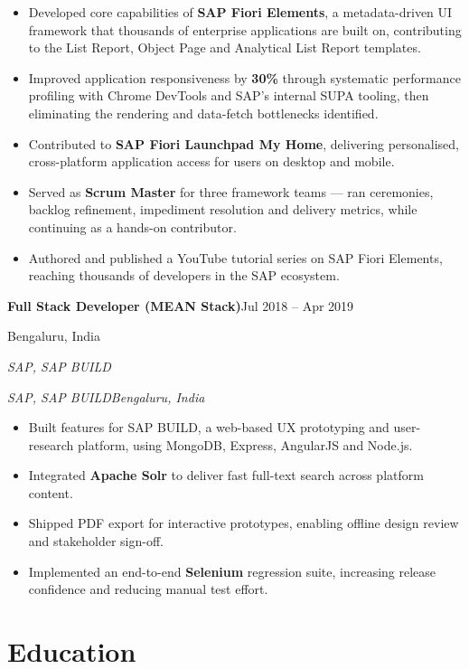 \documentclass[11pt,a4paper]{article}
\makeatletter
\newcommand{\role}[2]{{\parfillskip=0pt\relax\noindent\textbf{#1}\hfill #2\par}}
\newcommand{\org}[2]{%
  \def\@tmp{#2}%
  \ifx\@tmp\@empty
    {\noindent\textit{#1}\par}%
  \else
    {\parfillskip=0pt\relax\noindent\textit{#1}\hfill\textit{#2}\par}%
  \fi
  \vspace{2pt}}
\makeatother
\begin{document}
\begin{itemize}
  \item Developed core capabilities of \textbf{SAP Fiori Elements}, a metadata-driven UI framework
        that thousands of enterprise applications are built on, contributing to the List Report,
        Object Page and Analytical List Report templates.
  \item Improved application responsiveness by \textbf{30\%} through systematic performance
        profiling with Chrome DevTools and SAP's internal SUPA tooling, then eliminating the
        rendering and data-fetch bottlenecks identified.
  \item Contributed to \textbf{SAP Fiori Launchpad My Home}, delivering personalised, cross-platform
        application access for users on desktop and mobile.
  \item Served as \textbf{Scrum Master} for three framework teams --- ran ceremonies, backlog
        refinement, impediment resolution and delivery metrics, while continuing as a hands-on
        contributor.
  \item Authored and published a YouTube tutorial series on SAP Fiori Elements, reaching thousands
        of developers in the SAP ecosystem.
\end{itemize}

\role{Full Stack Developer (MEAN Stack)}{Jul 2018 -- Apr 2019}
\org{SAP, SAP BUILD}{Bengaluru, India}

\begin{itemize}
  \item Built features for SAP BUILD, a web-based UX prototyping and user-research platform, using
        MongoDB, Express, AngularJS and Node.js.
  \item Integrated \textbf{Apache Solr} to deliver fast full-text search across platform content.
  \item Shipped PDF export for interactive prototypes, enabling offline design review and
        stakeholder sign-off.
  \item Implemented an end-to-end \textbf{Selenium} regression suite, increasing release confidence
        and reducing manual test effort.
\end{itemize}

\section{Education}
\end{document}
